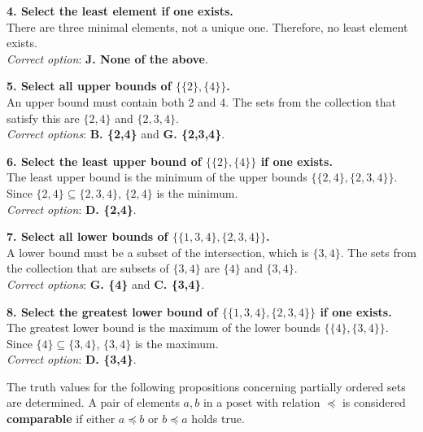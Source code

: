 \documentclass[10pt]{article}
\theoremstyle{definition}
\theoremstyle{plain}
\numberwithin{equation}{section}
\begin{document}
\vspace{1em}
\noindent\textbf{4. Select the least element if one exists.} \\
There are three minimal elements, not a unique one. Therefore, no least element exists. \\
\textit{Correct option}: \textbf{J. None of the above}.

\vspace{1em}
\noindent\textbf{5. Select all upper bounds of $\{\{2\},\{4\}\}$.} \\
An upper bound must contain both 2 and 4. The sets from the collection that satisfy this are $\{2,4\}$ and $\{2,3,4\}$. \\
\textit{Correct options}: \textbf{B. \{2,4\}} and \textbf{G. \{2,3,4\}}.

\vspace{1em}
\noindent\textbf{6. Select the least upper bound of $\{\{2\},\{4\}\}$ if one exists.} \\
The least upper bound is the minimum of the upper bounds $\{\{2,4\}, \{2,3,4\}\}$. Since $\{2,4\} \subseteq \{2,3,4\}$, $\{2,4\}$ is the minimum. \\
\textit{Correct option}: \textbf{D. \{2,4\}}.

\vspace{1em}
\noindent\textbf{7. Select all lower bounds of $\{\{1,3,4\},\{2,3,4\}\}$.} \\
A lower bound must be a subset of the intersection, which is $\{3,4\}$. The sets from the collection that are subsets of $\{3,4\}$ are $\{4\}$ and $\{3,4\}$. \\
\textit{Correct options}: \textbf{G. \{4\}} and \textbf{C. \{3,4\}}.

\vspace{1em}
\noindent\textbf{8. Select the greatest lower bound of $\{\{1,3,4\},\{2,3,4\}\}$ if one exists.} \\
The greatest lower bound is the maximum of the lower bounds $\{\{4\}, \{3,4\}\}$. Since $\{4\} \subseteq \{3,4\}$, $\{3,4\}$ is the maximum. \\
\textit{Correct option}: \textbf{D. \{3,4\}}.






\newpage

The truth values for the following propositions concerning partially ordered sets are determined. A pair of elements $a, b$ in a poset with relation $\preceq$ is considered \textbf{comparable} if either $a \preceq b$ or $b \preceq a$ holds true.
\end{document}
